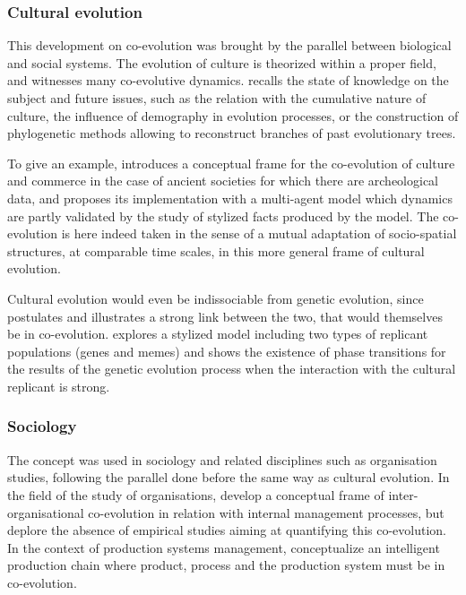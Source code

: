 \documentclass[letterpaper]{article}
\begin{document}
\subsubsection{Cultural evolution}

This development on co-evolution was brought by the parallel between biological and social systems. The evolution of culture is theorized within a proper field, and witnesses many co-evolutive dynamics. \cite{Mesoudi25072017} recalls the state of knowledge on the subject and future issues, such as the relation with the cumulative nature of culture, the influence of demography in evolution processes, or the construction of phylogenetic methods allowing to reconstruct branches of past evolutionary trees.

To give an example, \cite{carrignon2015modelling} introduces a conceptual frame for the co-evolution of culture and commerce in the case of ancient societies for which there are archeological data, and proposes its implementation with a multi-agent model which dynamics are partly validated by the study of stylized facts produced by the model. The co-evolution is here indeed taken in the sense of a mutual adaptation of socio-spatial structures, at comparable time scales, in this more general frame of cultural evolution.


Cultural evolution would even be indissociable from genetic evolution, since \cite{durham1991coevolution} postulates and illustrates a strong link between the two, that would themselves be in co-evolution. \cite{bull2000meme} explores a stylized model including two types of replicant populations (genes and memes) and shows the existence of phase transitions for the results of the genetic evolution process when the interaction with the cultural replicant is strong.


\subsubsection{Sociology}

The concept was used in sociology and related disciplines such as organisation studies, following the parallel done before the same way as cultural evolution. In the field of the study of organisations, \cite{volberda2003co} develop a conceptual frame of inter-organisational co-evolution in relation with internal management processes, but deplore the absence of empirical studies aiming at quantifying this co-evolution. In the context of production systems management, \cite{tolio2010species} conceptualize an intelligent production chain where product, process and the production system must be in co-evolution.
\end{document}
